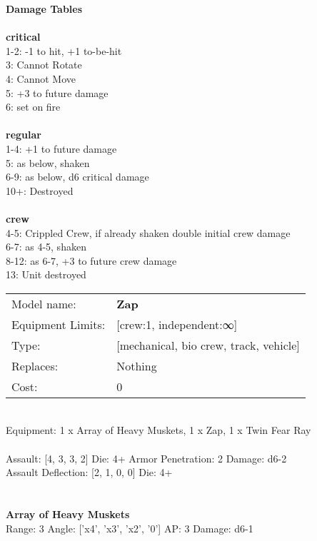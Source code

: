 {\bf Damage Tables} \\
\ \\ {\bf critical } \\
1-2: -1 to hit, +1 to-be-hit \\
3: Cannot Rotate \\
4: Cannot Move \\
5: +3 to future damage \\
6: set on fire \\
\ \\ {\bf regular } \\
1-4: +1 to future damage \\
5: as below, shaken \\
6-9: as below, d6 critical damage \\
10+: Destroyed \\
\ \\ {\bf crew } \\
4-5: Crippled Crew, if already shaken double initial crew damage \\
6-7: as 4-5, shaken \\
8-12: as 6-7, +3 to future crew damage \\
13: Unit destroyed \\


\noindent
\begin{tabular}{ll}
Model name: &{\bf Zap } \\
Equipment Limits: &[crew:1, independent:∞] \\
Type: &[mechanical, bio crew, track, vehicle] \\
Replaces: &Nothing \\
Cost: & 0\\
\end{tabular}
\ \\
Equipment: 1 x Array of Heavy Muskets, 1 x Zap, 1 x Twin Fear Ray \\
\ \\
Assault: [4, 3, 3, 2] Die: 4+ Armor Penetration: 2 Damage: d6-2 \\
Assault Deflection: [2, 1, 0, 0] Die: 4+\\
\indent  
\ \\

\ \\
{\bf Array of Heavy Muskets } \\



Range: 3  Angle: ['x4', 'x3', 'x2', '0'] AP: 3 Damage: d6-1 \\




